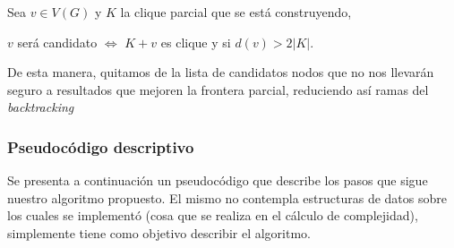 \begin{description}
        \bigskip
        \par Sea $v \in V(G)$ y $K$ la clique parcial que se est\'a construyendo,
        \par $v$ ser\'a candidato $\iff$ $K+v$ es clique y si $d(v) > 2|K|$.

        \bigskip
        \par De esta manera, quitamos de la lista de candidatos nodos que no nos
            llevar\'an seguro a resultados que mejoren la frontera parcial, reduciendo
            as\'i ramas del \emph{backtracking}

\end{description}

\subsubsection{Pseudoc\'odigo descriptivo}
\par Se presenta a continuaci\'on un pseudoc\'odigo que describe los pasos que sigue
    nuestro algoritmo propuesto. El mismo no contempla estructuras de datos sobre
    los cuales se implement\'o (cosa que se realiza en el c\'alculo de complejidad),
    simplemente tiene como objetivo describir el algoritmo.


